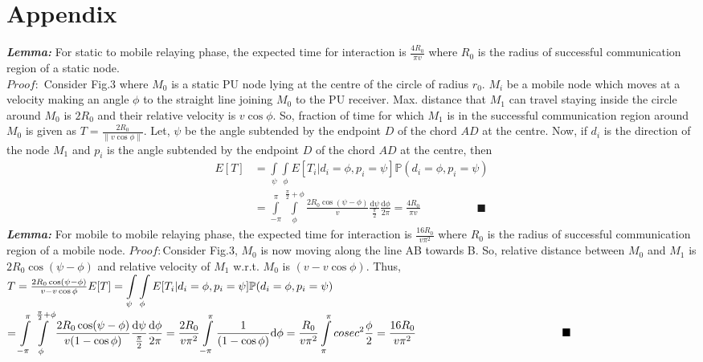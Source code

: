 \documentclass[conference]{IEEEtran}
\begin{document}
\section{Appendix}
\emph{\bf Lemma:} For static to mobile relaying phase, the expected time for interaction is $\frac{4R_0}{\pi v}$ where $R_0$ is the radius of successful communication region of 
a static node.\\ 
$Proof: $ Consider Fig.3 where $M_0$ is a static PU node
 lying at the centre of the circle of radius $r_0$. $M_i$ be a mobile node which moves at a velocity making an angle $\phi$ to the straight line joining $M_0$ to the PU receiver. Max. distance
that $M_1$ can travel staying inside the circle around $M_0$ is $2R_0$ and their relative velocity is $v\cos\phi$. So, fraction of time for which $M_1$ is in the successful 
communication region around $M_0$ is given as $T=\frac{2R_0}{\|v\cos\phi\|}$. Let, $\psi$ be the angle subtended by the endpoint $D$ of the chord $AD$ at the centre. Now, if $d_i$ is the direction
 of the node $M_1$ and $p_i$ is the angle subtended by the endpoint $D$ of the chord $AD$ at the centre, then 
\begin{align*}
E[T]&=\displaystyle\int\limits_\psi\displaystyle\int\limits_\phi E[T_i|d_i=\phi,p_i=\psi]\mathbb{P}(d_i=\phi,p_i=\psi)\\
&=\displaystyle\int\limits_{-\pi}^\pi\displaystyle\int\limits_\phi^{\frac{\pi}{2}+\phi}\frac{2R_0\cos(\psi-\phi)}{v}\frac{\mathrm{d}\psi}{\frac{\pi}{2}}\frac{\mathrm{d}\phi}{2\pi}=\frac{4R_0}
{\pi v}\quad\quad\quad\quad\quad\blacksquare
\end{align*}
\emph{\bf Lemma:} For mobile to mobile relaying phase, the expected time for interaction is $\frac{16R_0}{v\pi^2}$ where $R_0$ is the radius of successful communication region of a mobile node.
$Proof: $Consider Fig.3, $M_0$ is now moving along the line AB towards B. So, relative distance between $M_0$ and $M_1$ is $2R_0\cos(\psi-\phi)$ and relative 
velocity of $M_1$ w.r.t. $M_0$ is $(v-v\cos\phi)$. Thus, $T=\frac{2R_0\cos(\psi-\phi)}{v-v\cos\phi}\\ E[T]=\displaystyle\int\limits_\psi\displaystyle\int\limits_\phi E[T_i|d_i=\phi,p_i=\psi]\mathbb{P}
(d_i=\phi,p_i=\psi)$\\$=\displaystyle\int\limits_{-\pi}^\pi\displaystyle\int\limits_\phi^{\frac{\pi}{2}+\phi}\frac{2R_0\cos(\psi-\phi)}{v(1-\cos\phi)}\frac{\mathrm{d}\psi}{\frac{\pi}{2}}\frac{\mathrm{d}\phi}{2\pi}
=\frac{2R_0}{v\pi^2}\displaystyle\int\limits_{-\pi}^\pi\frac{1}{(1-\cos\phi)}\mathrm{d}\phi\\=\frac{R_0}{v\pi^2}\displaystyle\int\limits_\pi^\pi cosec^2\frac{\phi}{2}=\frac{16R_0}{v\pi^2}\quad\quad\quad\quad\quad\quad\quad\quad\quad\quad\quad\quad\quad\blacksquare$
\end{document}
